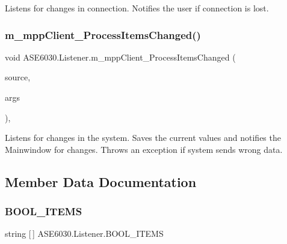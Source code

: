 Listens for changes in connection. Notifies the user if connection is lost. 

\mbox{\label{class_a_s_e6030_1_1_listener_a215911bec08fdd4671b17ad9a13944f2}} 
\subsubsection{\texorpdfstring{m\+\_\+mpp\+Client\+\_\+\+Process\+Items\+Changed()}{m\_mppClient\_ProcessItemsChanged()}}
{\footnotesize\ttfamily void A\+S\+E6030.\+Listener.\+m\+\_\+mpp\+Client\+\_\+\+Process\+Items\+Changed (\begin{DoxyParamCaption}\item[{object}]{source,  }\item[{Ua\+Lib.\+Process\+Item\+Changed\+Event\+Args}]{args }\end{DoxyParamCaption})\hspace{0.3cm}{\ttfamily [inline]}, {\ttfamily [private]}}



Listens for changes in the system. Saves the current values and notifies the Mainwindow for changes. Throws an exception if system sends wrong data. 



\subsection{Member Data Documentation}
\mbox{\label{class_a_s_e6030_1_1_listener_a99f2d555edabbf3c8ea4d897674d278e}} 
\subsubsection{\texorpdfstring{B\+O\+O\+L\+\_\+\+I\+T\+E\+MS}{BOOL\_ITEMS}}
{\footnotesize\ttfamily string \mbox{[}$\,$\mbox{]} A\+S\+E6030.\+Listener.\+B\+O\+O\+L\+\_\+\+I\+T\+E\+MS\hspace{0.3cm}{\ttfamily [private]}}

